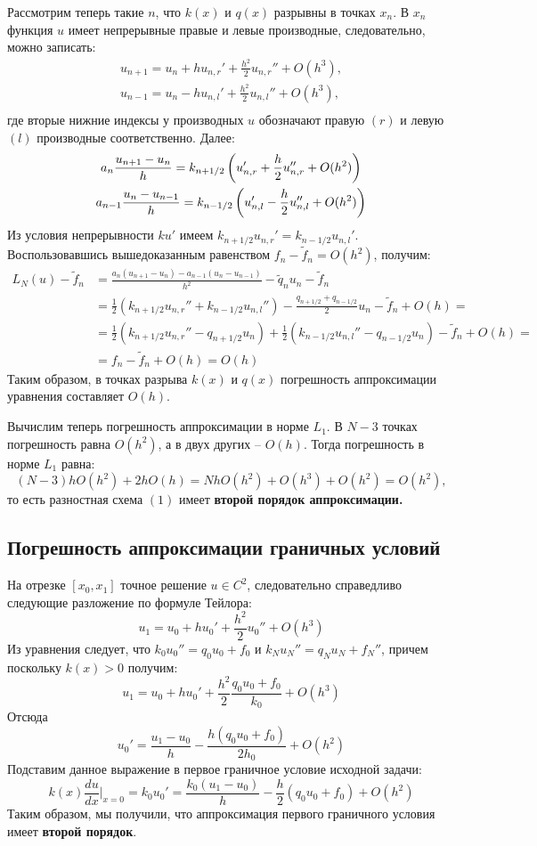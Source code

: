 \documentclass[titlepage]{article}
\def\l{\left}
\def\r{\right}
\begin{document}
Рассмотрим теперь такие $n$, что $k(x)$ и $q(x)$ разрывны в точках $x_n$. В $x_n$ функция $u$ имеет непрерывные правые и левые производные, следовательно, можно записать:
\begin{gather*}
	u_{n+1} = u_n + hu_{n,r}' + \frac{h^2}{2}u_{n,r}'' + O(h^3), \\
	u_{n-1} = u_n - hu_{n,l}' + \frac{h^2}{2}u_{n,l}'' + O(h^3), \\
\end{gather*}
где вторые нижние индексы у производных $u$ обозначают правую $(r)$ и левую $(l)$ производные соответственно. Далее:
\begin{gather*}
	\notag a_n\frac{u_{n+1} - u_n}{h} = k_{n+1/2} \l(u_{n,r}' + \frac{h}{2}u_{n,r}'' + O(h^2) \r) \\
	\notag a_{n-1}\frac{u_n - u_{n-1}}{h} = k_{n-1/2} \l(u_{n,l}' - \frac{h}{2}u_{n,l}'' + O(h^2) \r)
\end{gather*}
Из условия непрерывности $ku'$ имеем $k_{n+1/2}u_{n,r}' = k_{n-1/2}u_{n,l}'$. Воспользовавшись вышедоказанным равенством $f_n - \tilde f_n = O(h^2)$, получим:
\begin{align*}
	L_{N}(u) - \tilde f_n &= \frac{a_n(u_{n+1}-u_n) - a_{n-1}(u_n - u_{n-1})}{h^2} - \tilde q_n u_n - \tilde f_n \\ 
	&= \frac{1}{2}(k_{n+1/2}u_{n,r}'' + k_{n-1/2}u_{n,l}'') - \frac{q_{n+1/2}+q_{n-1/2}}{2}u_n - \tilde f_n + O(h) = \\
	&= \frac{1}{2}(k_{n+1/2}u_{n,r}'' - q_{n+1/2}u_n) + \frac{1}{2}(k_{n-1/2}u_{n,l}'' - q_{n-1/2}u_n) - \tilde f_n + O(h) = \\ 
	&= f_n - \tilde f_n + O(h) = O(h)
\end{align*}
Таким образом, в точках разрыва $k(x)$ и $q(x)$ погрешность аппроксимации уравнения составляет $O(h)$. 

Вычислим теперь погрешность аппроксимации в норме $L_1$. В $N-3$ точках погрешность равна $O(h^2)$, а в двух других -- $O(h)$. Тогда погрешность в норме $L_1$ равна:
$$(N-3)hO(h^2) + 2hO(h) = NhO(h^2) + O(h^3) + O(h^2) = O(h^2),$$
то есть разностная схема $(1)$ имеет \textbf{второй порядок аппроксимации.}
\subsection{Погрешность аппроксимации граничных условий}
На отрезке $[x_0, x_1]$ точное решение $u \in C^2$, следовательно справедливо следующие разложение по формуле Тейлора:
$$u_1 = u_0 + hu_0' + \frac{h^2}{2}u_0'' + O(h^3) $$
Из уравнения следует, что $k_0 u_0'' = q_0 u_0 + f_0$ и $k_N u_N'' = q_N u_N + f_N''$, причем поскольку $k(x) > 0$ получим:
$$ u_1 = u_0 + hu_0' + \frac{h^2}{2} \frac{q_0 u_0 + f_0}{k_0} + O(h^3) $$
Отсюда
$$u_0' = \frac{u_1-u_0}{h} - \frac{h(q_0 u_0 + f_0)}{2h_0} + O(h^2)$$
Подставим данное выражение в первое граничное условие исходной задачи:
$$k(x)\frac{du}{dx}\Big|_{x = 0} = k_0 u_0' = \frac{k_0(u_1-u_0)}{h} - \frac{h}{2}(q_0 u_0 + f_0) + O(h^2)$$
Таким образом, мы получили, что аппроксимация первого граничного условия имеет \textbf{второй порядок}.
\end{document}
